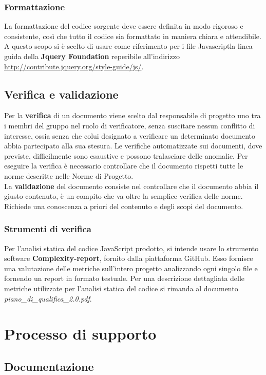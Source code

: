 \documentclass[a4paper,11pt]{article}
\begin{document}
		\subsubsection{Formattazione}
		La formattazione del codice sorgente deve essere definita in modo rigoroso e consistente, così
che tutto il codice sia formattato in maniera chiara e attendibile. A questo scopo si è scelto di usare come riferimento per i file Javascript\addglos  la linea guida della \textbf{Jquery Foundation} reperibile all'indirizzo \url{http://contribute.jquery.org/style-guide/js/}.
	\subsection{Verifica e validazione}
	Per la \textbf{verifica} di un documento viene scelto dal responsabile di progetto uno tra i membri del gruppo nel ruolo di verificatore, senza suscitare nessun conflitto di interesse, ossia senza che colui designato a verificare un determinato documento abbia partecipato alla sua stesura.
	 Le verifiche automatizzate sui documenti, dove previste, difficilmente sono esaustive e possono tralasciare delle anomalie. Per eseguire la verifica è necessario controllare che il documento rispetti tutte le norme descritte nelle Norme di Progetto. \\
	La \textbf{validazione} del documento consiste nel controllare che il documento abbia il giusto contenuto, è un compito che va oltre la semplice verifica delle norme. Richiede una conoscenza a priori del contenuto e degli scopi del documento.
\subsubsection{Strumenti di verifica}

Per l'analisi statica del codice JavaScript prodotto, si intende usare lo strumento software \textbf{Complexity-report\addglos}, fornito dalla piattaforma GitHub.
Esso fornisce una valutazione delle metriche sull'intero progetto analizzando ogni singolo file e fornendo un report in formato testuale.
Per una descrizione dettagliata delle metriche utilizzate per l'analisi statica del codice si rimanda al documento \textit{piano\_di\_qualifica\_2.0.pdf}.
		
	\section{Processo di supporto}
		\subsection{Documentazione}
		
\end{document}
